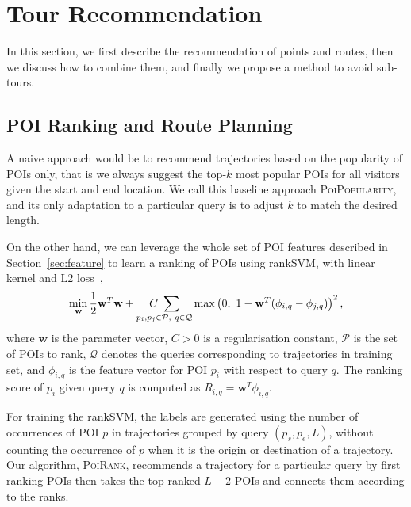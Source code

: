 
\secmoveup
\section{Tour Recommendation}
\label{sec:recommendation}

In this section, we first describe the recommendation of points and routes,
then we discuss how to combine them, and finally we propose a method to avoid sub-tours.

\secmoveup
\subsection{POI Ranking and Route Planning}
\label{sec:rankplan}

A naive approach would be to recommend trajectories based on the popularity of POIs only,
that is we always suggest the top-$k$ most popular POIs for all visitors given the start and end location.
We call this baseline approach \textsc{PoiPopularity},
and its only adaptation to a particular query is to adjust $k$ to match the desired length.

On the other hand, we can leverage the whole set of POI features described in Section~\ref{sec:feature}
to learn a ranking of POIs using rankSVM, with linear kernel and L$2$ loss~\cite{lranksvm},
\eqmoveup
\begin{equation*}
\eqmoveup
\min_{\mathbf{w}} \frac{1}{2}
                  \mathbf{w}^T \mathbf{w} +
                  \underset{p_i, p_j \in \mathcal{P},~ q \in \mathcal{Q}}{C ~\sum}
                  \max \left( 0,~ 1 - \mathbf{w}^T (\phi_{i,q} - \phi_{j,q}) \right)^2,
\end{equation*}
where $\mathbf{w}$ is the parameter vector,
$C > 0$ is a regularisation constant,
$\mathcal{P}$ is the set of POIs to rank,
$\mathcal{Q}$ denotes the queries corresponding to trajectories in training set,
and $\phi_{i,q}$ is the feature vector for POI $p_i$ with respect to query $q$. %
The ranking score of $p_i$ given query $q$ is computed as $R_{i,q} =\mathbf{w}^T \phi_{i,q}$. 

For training the rankSVM, the labels are generated using the number of occurrences of
POI $p$ in trajectories grouped by query $(p_s, p_e, L)$,
without counting the occurrence of $p$ when it is the origin or destination of a trajectory.
Our algorithm, \textsc{PoiRank}, recommends a trajectory for a particular query
by first ranking POIs
then takes the top ranked $L-2$ POIs and connects them according to the ranks.



